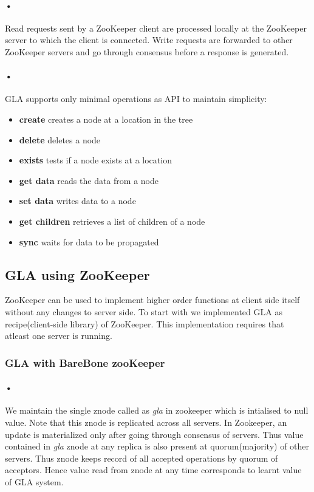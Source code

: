 \documentclass[a4paper,12pt]{report}
\begin{document}
\paragraph*{•}
Read requests sent by a ZooKeeper client are processed locally at the ZooKeeper server to which the client is connected.  Write requests are forwarded to other ZooKeeper servers and go through consensus before a response is generated.

\paragraph*{•}
GLA supports only minimal operations as API to maintain simplicity:
\begin{itemize}
\item \textbf{create} creates a node at a location in the tree
\item \textbf{delete} deletes a node
\item \textbf{exists} tests if a node exists at a location
\item \textbf{get data} reads the data from a node
\item \textbf{set data} writes data to a node
\item \textbf{get children} retrieves a list of children of a node
\item \textbf{sync} waits for data to be propagated
\end{itemize}

\subsection{GLA using ZooKeeper}
ZooKeeper can be used to implement higher order functions at client side itself without any changes to server side. To start with we implemented GLA as recipe(client-side library) of ZooKeeper.
This implementation requires that atleast one server is running.
\subsubsection{GLA with BareBone zooKeeper}
\paragraph{•}
 We maintain the single znode called as \textit{gla} in zookeeper which is intialised to null value. Note that this znode is replicated across all servers. In Zookeeper, an update is materialized only after going through consensus of servers. Thus value contained in \textit{gla} znode at any replica is also present at quorum(majority) of other servers. Thus znode keeps record of all accepted operations by quorum of acceptors. Hence value read from znode at any time corresponds to learnt value of GLA system. 
\end{document}
